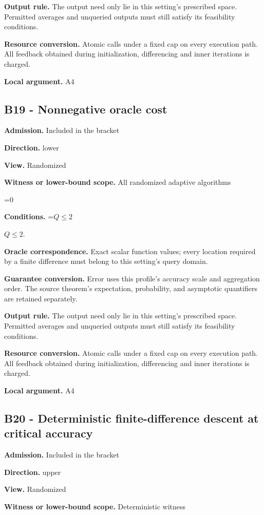 \documentclass[10pt,a4paper]{article}
\newcommand{\AtlasMath}[1]{\par\begingroup\centering\setbox0=\hbox{$\displaystyle #1$}\ifdim\wd0>1.4\linewidth\typeout{ATLAS WIDE FORMULA: \the\wd0}\fi\ifdim\wd0>\linewidth\resizebox{\linewidth}{!}{\box0}\else\box0\fi\par\endgroup}
\newcommand{\AtlasInlineMath}[1]{\begingroup\setbox0=\hbox{$#1$}\ifdim\wd0>.4\linewidth\endgroup\AtlasMath{#1}\else\endgroup$#1$\fi}
\begin{document}
\textbf{Output rule.} The output need only lie in this setting's prescribed space. Permitted averages and unqueried outputs must still satisfy its feasibility conditions.

\textbf{Resource conversion.} Atomic calls under a fixed cap on every execution path. All feedback obtained during initialization, differencing and inner iterations is charged.

\textbf{Local argument.} A4

\subsection{B19 - Nonnegative oracle cost}
\textbf{Admission.} Included in the bracket

\textbf{Direction.} lower

\textbf{View.} Randomized

\textbf{Witness or lower-bound scope.} All randomized adaptive algorithms

\AtlasMath{0}
\textbf{Conditions.} \AtlasInlineMath{Q\le2}.

\textbf{Oracle correspondence.} Exact scalar function values; every location required by a finite difference must belong to this setting's query domain.

\textbf{Guarantee conversion.} Error uses this profile's accuracy scale and aggregation order. The source theorem's expectation, probability, and asymptotic quantifiers are retained separately.

\textbf{Output rule.} The output need only lie in this setting's prescribed space. Permitted averages and unqueried outputs must still satisfy its feasibility conditions.

\textbf{Resource conversion.} Atomic calls under a fixed cap on every execution path. All feedback obtained during initialization, differencing and inner iterations is charged.

\textbf{Local argument.} A4

\subsection{B20 - Deterministic finite-difference descent at critical accuracy}
\textbf{Admission.} Included in the bracket

\textbf{Direction.} upper

\textbf{View.} Randomized

\textbf{Witness or lower-bound scope.} Deterministic witness
\end{document}
